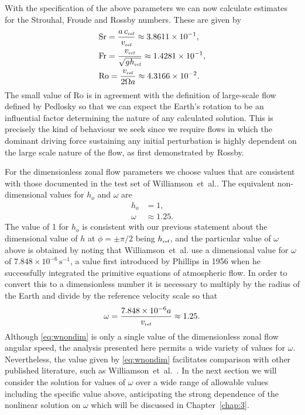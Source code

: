 With the specification of the above parameters we can now calculate estimates for the Strouhal, Froude and Rossby numbers. These are given by
\begin{align}
&\mathrm{Sr} = \displaystyle \frac{a\,c_{\mbox{\tiny ref}}}{v_{\mbox{\tiny ref}}} \approx3.8611 \times 10^{-1},\\
&\mathrm{Fr} = \displaystyle \frac{v_{\mbox{\tiny ref}}}{\sqrt{gh_{\mbox{\tiny ref}}}} \approx1.4281 \times 10^{-1},\\
&\mathrm{Ro} = \displaystyle \frac{v_{\mbox{\tiny ref}}}{2\Omega a} \approx 4.3166 \times 10^{-2}.
\end{align}
The small value of $\mathrm{Ro}$ is in agreement with the definition of large-scale flow defined by Pedlosky\cite[pages 2--3]{Pedlosky:GFD} so that we can expect the Earth's rotation to be an influential factor determining the nature of any calculated solution. This is precisely the kind of behaviour we seek since we require flows in which the dominant driving force sustaining any initial perturbation is highly dependent on the large scale nature of the flow, as first demonstrated by Rossby\cite{Rossby:RBV}.

For the dimensionless zonal flow parameters we choose values that are consistent with those documented in the test set of Williamson~et~al.\cite{Williamson:STS}. The equivalent non-dimensional values for $h_o$ and $\omega$ are
\begin{align}
h_o&=1,\\
\omega&\approx1.25.
\end{align}
The value of 1 for $h_o$ is consistent with our previous statement about the dimensional value of $h$ at $\phi=\pm \pi/2$ being $h_{\mbox{\tiny ref}}$, and the particular value of $\omega$ above is obtained by noting that Williamson~et~al. use a dimensional value for $\omega$ of $7.848\times10^{-6}\,\text{s}^{-1}$, a value first introduced by Phillips\cite{Phillips:NIP} in 1956 when he successfully integrated the primitive equations of atmospheric flow. In order to convert this to a dimensionless number it is necessary to multiply by the radius of the Earth and divide by the reference velocity scale so that
\begin{equation}
\omega=\frac{7.848\times10^{-6}a}{v_{\mbox{\tiny ref}}}\approx1.25.
\label{eq:wnondim}
\end{equation}
Although \eqref{eq:wnondim} is only a single value of the dimensionless zonal flow angular speed, the analysis presented here permits a wide variety of values for $\omega$.  Nevertheless, the value given by \eqref{eq:wnondim} facilitates comparison with other published literature, such as Williamson~et~al.~\cite{Williamson:STS}. In the next section we will consider the solution for values of $\omega$ over a wide range of allowable values including the specific value above, anticipating the strong dependence of the nonlinear solution on $\omega$ which will be discussed in Chapter~\ref{chap:3}.

